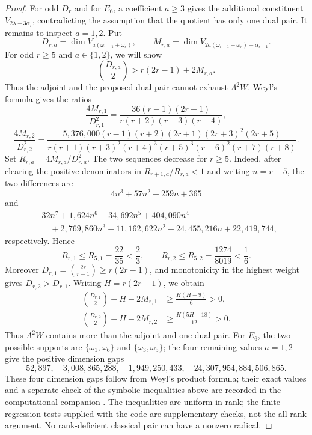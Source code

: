 \documentclass[11pt]{article}
\theoremstyle{remark}
\begin{document}
\begin{proof}
For odd \(D_r\) and for \(E_6\), a coefficient \(a\ge3\) gives the additional
constituent \(V_{2\lambda-3\alpha_i}\), contradicting the assumption that
the quotient has only one dual pair.  It remains to inspect \(a=1,2\).  Put
\[
 D_{r,a}=\dim V_{a(\omega_{r-1}+\omega_r)},\qquad
 M_{r,a}=\dim V_{2a(\omega_{r-1}+\omega_r)-\alpha_{r-1}}.
\]
For odd \(r\ge5\) and \(a\in\{1,2\}\), we will show
\[
 \binom{D_{r,a}}2>r(2r-1)+2M_{r,a}.
\]
Thus the adjoint and the proposed dual pair cannot exhaust \(\Lambda^2W\).
Weyl's formula gives the ratios
\[
 \frac{4M_{r,1}}{D_{r,1}^2}
 =\frac{36(r-1)(2r+1)}{r(r+2)(r+3)(r+4)},
\]
\[
 \frac{4M_{r,2}}{D_{r,2}^2}
 =\frac{5{,}376{,}000(r-1)(r+2)(2r+1)(2r+3)^2(2r+5)}
 {r(r+1)(r+3)^2(r+4)^3(r+5)^3(r+6)^2(r+7)(r+8)}.
\]
Set \(R_{r,a}=4M_{r,a}/D_{r,a}^2\).  The two sequences decrease for
\(r\ge5\).  Indeed, after clearing the positive denominators in
\(R_{r+1,a}/R_{r,a}<1\) and writing \(n=r-5\), the two differences are
\[
 4n^3+57n^2+259n+365
\]
and
\[
\begin{aligned}
 &32n^7+1{,}624n^6+34{,}692n^5+404{,}090n^4\\
 &\quad+2{,}769{,}860n^3+11{,}162{,}622n^2
      +24{,}455{,}216n+22{,}419{,}744,
\end{aligned}
\]
respectively.  Hence
\[
 R_{r,1}\le R_{5,1}=\frac{22}{35}<\frac23,
 \qquad
 R_{r,2}\le R_{5,2}=\frac{1274}{8019}<\frac16.
\]
Moreover
\(D_{r,1}=\binom{2r}{r-1}\ge r(2r-1)\), and monotonicity in the highest
weight gives \(D_{r,2}>D_{r,1}\).  Writing \(H=r(2r-1)\), we obtain
\[
\begin{aligned}
 \binom{D_{r,1}}2-H-2M_{r,1}
 &\ge \frac{H(H-9)}6>0,\\
 \binom{D_{r,2}}2-H-2M_{r,2}
 &\ge \frac{H(5H-18)}{12}>0.
\end{aligned}
\]
Thus \(\Lambda^2W\) contains more than the adjoint and one dual pair.  For
\(E_6\), the two possible supports are
\(\{\omega_1,\omega_6\}\) and \(\{\omega_3,\omega_5\}\); the four remaining
values \(a=1,2\) give the positive dimension gaps
\[
 52{,}897,\quad3{,}008{,}865{,}288,
 \quad1{,}949{,}250{,}433,
 \quad24{,}307{,}954{,}884{,}506{,}865.
\]
These four dimension gaps follow from Weyl's product formula; their exact
values and a separate check of the symbolic inequalities above are recorded
in the computational companion \cite{ComputationalCompanion}.
The inequalities are uniform in rank; the finite regression tests supplied
with the code are supplementary checks, not the all-rank argument.
No rank-deficient classical pair can have a nonzero radical.
\end{proof}
\end{document}
